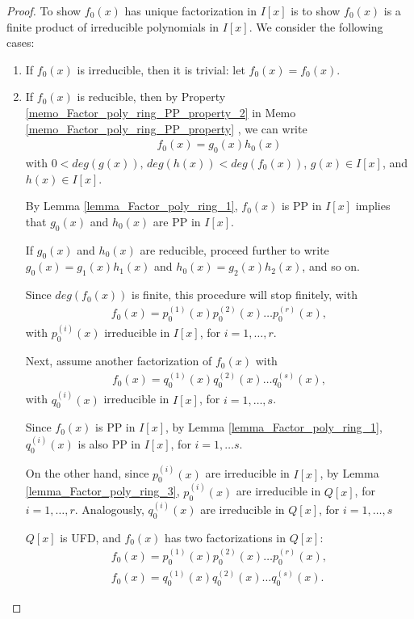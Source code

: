 \documentclass[utf8]{ctexbook}
\theoremstyle{definition}
\begin{document}
\begin{proof}
To show $f_0 (x)$ has unique factorization in $I[x]$ is to show $f_0 (x)$ is a finite product of irreducible polynomials in $I[x]$. We consider the following cases:
\begin{enumerate}
\item{If $f_0 (x)$ is irreducible, then it is trivial: let $f_0 (x) = f_0 (x)$.}
\item{If $f_0 (x)$ is reducible, then by Property \ref{memo_Factor_poly_ring_PP_property_2} in Memo \ref{memo_Factor_poly_ring_PP_property} , we can write
\begin{align*}
f_0 (x) = g_0 (x) h_0 (x)
\end{align*}
with $0 < deg(g(x)), \, deg(h(x)) < deg(f_0 (x))$, $g(x) \in I[x] $, and $h(x) \in I[x]$. 

By Lemma \ref{lemma_Factor_poly_ring_1}, $f_0 (x)$ is PP in $I[x]$ implies that $g_0 (x)$ and $h_0 (x)$ are PP in $I[x]$.

If $g_0 (x)$ and $h_0 (x)$ are reducible, proceed further to write $g_0 (x) = g_1 (x) h_1 (x)$ and $h_0 (x) = g_2 (x) h_2 (x)$, and so on.

Since $deg(f_0 (x))$ is finite, this procedure will stop finitely, with
\begin{align*}
f_0 (x) = p_0 ^{(1)} (x) p_0 ^{(2)} (x) \ldots p_0 ^{(r)} (x) ,
\end{align*}
with $p_0 ^{(i)} (x)$ irreducible in $I[x]$, for $i = 1, \ldots, r$.

Next, assume another factorization of $f_0 (x)$ with
\begin{align*}
f_0 (x) = q_0 ^{(1)} (x) q_0 ^{(2)} (x) \ldots q_0 ^{(s)} (x) ,
\end{align*}
with $q_0 ^{(i)} (x)$ irreducible in $I[x]$, for $i = 1, \ldots, s$. 

Since $f_0(x)$ is PP in $I[x]$, by Lemma \ref{lemma_Factor_poly_ring_1}, $q_0 ^{(i)} (x)$ is also PP in $I[x]$, for $i = 1, \ldots s$.

On the other hand, since $p_0 ^{(i)} (x)$ are irreducible in $I[x]$, by Lemma \ref{lemma_Factor_poly_ring_3}, $p_0 ^{(i)} (x)$ are irreducible in $Q[x]$, for $i = 1, \ldots, r$. Analogously, $q_0 ^{(i)} (x)$ are irreducible in $Q[x]$, for $i = 1, \ldots, s$

$Q[x]$ is UFD, and $f_0(x)$ has two factorizations in $Q[x]$:
\begin{align*}
f_0 (x) = p_0 ^{(1)} (x) p_0 ^{(2)} (x) \ldots p_0 ^{(r)} (x) , \\
f_0 (x) = q_0 ^{(1)} (x) q_0 ^{(2)} (x) \ldots q_0 ^{(s)} (x) .
\end{align*}

}
\end{enumerate}
\end{proof}
\end{document}
